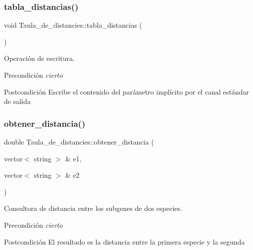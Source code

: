 \subsubsection{\texorpdfstring{tabla\+\_\+distancias()}{tabla\_distancias()}}
{\footnotesize\ttfamily void Taula\+\_\+de\+\_\+distancies\+::tabla\+\_\+distancias (\begin{DoxyParamCaption}{ }\end{DoxyParamCaption})}



Operación de escritura. 

\begin{DoxyPrecond}{Precondición}
{\itshape cierto} 
\end{DoxyPrecond}
\begin{DoxyPostcond}{Postcondición}
Escribe el contenido del parámetro implícito por el canal estándar de salida 
\end{DoxyPostcond}
\mbox{\label{class_taula__de__distancies_a53972d105426593de32bd70cdd297ccd}} 
\subsubsection{\texorpdfstring{obtener\+\_\+distancia()}{obtener\_distancia()}}
{\footnotesize\ttfamily double Taula\+\_\+de\+\_\+distancies\+::obtener\+\_\+distancia (\begin{DoxyParamCaption}\item[{vector$<$ string $>$ \&}]{e1,  }\item[{vector$<$ string $>$ \&}]{e2 }\end{DoxyParamCaption})}



Consultora de distancia entre los subgenes de dos especies. 

\begin{DoxyPrecond}{Precondición}
{\itshape cierto} 
\end{DoxyPrecond}
\begin{DoxyPostcond}{Postcondición}
El resultado es la distancia entre la primera especie y la segunda 
\end{DoxyPostcond}
\mbox{\label{class_taula__de__distancies_afb9dd4b7cca03fd7da25d60a8603e765}} 
